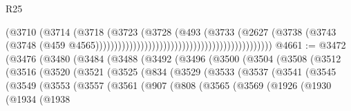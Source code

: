 \begin{lexlean}{R25}
\begin{coremodule}
{{{{{{{{{{{{{{{{{{{{{{{{{{{{{{{{{{{{{{{{{{{{{{{{{{{{{{{{{{{{{{{{{{{{{{{{{{{{{{{{{{{{{{{{{{{{{{{{{{{{{{{{{{{{{{{{{{{{{{{{{{{{{{{{{{{{{{{{{{{{{{{{{{{{{{{{{{{{{{{{{{{{{{{{{{{{{{{{{{{{{{{{{{{{{{{{{{{{{{{                                                                          (@3710
                                                                            (@3714
                                                                              (@3718
                                                                                (@3723
                                                                                  (@3728
                                                                                    (@493
                                                                                      (@3733
                                                                                        (@2627
                                                                                          (@3738
                                                                                            (@3743
                                                                                              (@3748
                                                                                                (@459
                                                                                                  @4565)))))))))))))))))))))))))))))))))))))))))))))))
@4661 := @3472
    (@3476
      (@3480
        (@3484
          (@3488
            (@3492
              (@3496
                (@3500
                  (@3504
                    (@3508
                      (@3512
                        (@3516
                          (@3520
                            (@3521
                              (@3525
                                (@834
                                  (@3529
                                    (@3533
                                      (@3537
                                        (@3541
                                          (@3545
                                            (@3549
                                              (@3553
                                                (@3557
                                                  (@3561
                                                    (@907
                                                      (@808
                                                        (@3565
                                                          (@3569
                                                            (@1926
                                                              (@1930
                                                                (@1934
                                                                  (@1938
}}}}}}}}}}}}}}}}}}}}}}}}}}}}}}}}}}}}}}}}}}}}}}}}}}}}}}}}}}}}}}}}}}}}}}}}}}}}}}}}}}}}}}}}}}}}}}}}}}}}}}}}}}}}}}}}}}}}}}}}}}}}}}}}}}}}}}}}}}}}}}}}}}}}}}}}}}}}}}}}}}}}}}}}}}}}}}}}}}}}}}}}}}}}}}}}}}}}}}}
\end{coremodule}
\end{lexlean}
